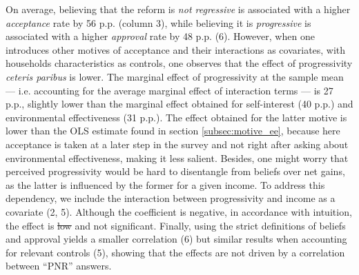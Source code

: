 \documentclass[12pt]{article} %
\providecommand{\DIFaddtex}[1]{{\protect\color{blue}\uwave{#1}}} %
\providecommand{\DIFdeltex}[1]{{\protect\color{red}\sout{#1}}}                      %
\providecommand{\DIFaddbegin}{} %
\providecommand{\DIFaddend}{} %
\providecommand{\DIFdelbegin}{} %
\providecommand{\DIFdelend}{} %
\providecommand{\DIFadd}[1]{\texorpdfstring{\DIFaddtex{#1}}{#1}} %
\providecommand{\DIFdel}[1]{\texorpdfstring{\DIFdeltex{#1}}{}} %
\newcommand{\DIFscaledelfig}{0.5}
\newlength{\DIFdelgraphicswidth} %
\newlength{\DIFdelgraphicsheight} %
\newcommand{\DIFaddincludegraphics}[2][]{{\color{blue}\fbox{\DIFOincludegraphics[#1]{#2}}}} %
\newcommand{\DIFdelincludegraphics}[2][]{%
\sbox{\DIFdelgraphicsbox}{\DIFOincludegraphics[#1]{#2}}%
\settoboxwidth{\DIFdelgraphicswidth}{\DIFdelgraphicsbox} %
\settoboxtotalheight{\DIFdelgraphicsheight}{\DIFdelgraphicsbox} %
\scalebox{\DIFscaledelfig}{%
\parbox[b]{\DIFdelgraphicswidth}{\usebox{\DIFdelgraphicsbox}\\[-\baselineskip] \rule{\DIFdelgraphicswidth}{0em}}\llap{\resizebox{\DIFdelgraphicswidth}{\DIFdelgraphicsheight}{%
\setlength{\unitlength}{\DIFdelgraphicswidth}%
\begin{picture}(1,1)%
\thicklines\linethickness{2pt} %
{\color[rgb]{1,0,0}\put(0,0){\framebox(1,1){}}}%
{\color[rgb]{1,0,0}\put(0,0){\line( 1,1){1}}}%
{\color[rgb]{1,0,0}\put(0,1){\line(1,-1){1}}}%
\end{picture}%
}\hspace*{3pt}}} %
} %
\DeclareRobustCommand{\DIFaddbegin}{\DIFOaddbegin \let\includegraphics\DIFaddincludegraphics} %
\DeclareRobustCommand{\DIFaddend}{\DIFOaddend \let\includegraphics\DIFOincludegraphics} %
\DeclareRobustCommand{\DIFdelbegin}{\DIFOdelbegin \let\includegraphics\DIFdelincludegraphics} %
\DeclareRobustCommand{\DIFdelend}{\DIFOaddend \let\includegraphics\DIFOincludegraphics} %
\begin{document}
On average, believing that the reform is \textit{not regressive} is associated with a higher \textit{acceptance} rate by 56 p.p. (column 3), while believing it is \textit{progressive} is associated with a higher \textit{approval} rate by 48 p.p. (6). However, when one introduces other motives of acceptance and their interactions as covariates, with households characteristics as controls, one observes that the effect of progressivity \textit{ceteris paribus} is lower. The marginal effect of progressivity at the sample mean --- i.e. accounting for the average marginal effect of interaction terms --- is 27 p.p., slightly lower than the marginal effect obtained for self-interest (40 p.p.) and environmental effectiveness (31 p.p.). The effect obtained for the latter motive is lower than the OLS estimate found in section \ref{subsec:motive_ee}, because here acceptance is taken at a later step in the survey and not right after asking about environmental effectiveness, making it less salient. Besides, one might worry that perceived progressivity would be hard to disentangle from beliefs over net gains, as the latter is influenced by the former for a given income. To address this dependency, we include the interaction between progressivity and income as a covariate (2, 5). Although the coefficient is negative, in accordance with intuition, the effect is \DIFdelbegin \DIFdel{low }\DIFdelend \DIFaddbegin \DIFadd{small }\DIFaddend and not significant. Finally, using the strict definitions of beliefs and approval yields a smaller correlation (6) but similar results when accounting for relevant controls (5), showing that the effects are not driven by a correlation between ``PNR'' answers.

\end{document}
